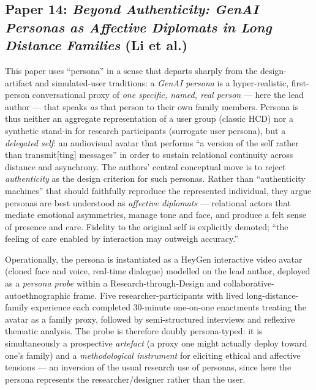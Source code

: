 
\subsection*{Paper 14: \textit{Beyond Authenticity: GenAI Personas as Affective Diplomats in Long Distance Families} (Li et al.)}

This paper uses ``persona'' in a sense that departs sharply from the design-artifact and simulated-user traditions: a \emph{GenAI persona} is a hyper-realistic, first-person conversational proxy of \emph{one specific, named, real person} --- here the lead author --- that speaks \emph{as} that person to their own family members. Persona is thus neither an aggregate representation of a user group (classic HCD) nor a synthetic stand-in for research participants (surrogate user persona), but a \emph{delegated self}: an audiovisual avatar that performs ``a version of the self rather than transmit[ting] messages'' in order to sustain relational continuity across distance and asynchrony. The authors' central conceptual move is to reject \emph{authenticity} as the design criterion for such personas. Rather than ``authenticity machines'' that should faithfully reproduce the represented individual, they argue personas are best understood as \emph{affective diplomats} --- relational actors that mediate emotional asymmetries, manage tone and face, and produce a felt sense of presence and care. Fidelity to the original self is explicitly demoted; ``the feeling of care enabled by interaction may outweigh accuracy.''

Operationally, the persona is instantiated as a HeyGen interactive video avatar (cloned face and voice, real-time dialogue) modelled on the lead author, deployed as a \emph{persona probe} within a Research-through-Design and collaborative-autoethnographic frame. Five researcher-participants with lived long-distance-family experience each completed 30-minute one-on-one enactments treating the avatar as a family proxy, followed by semi-structured interviews and reflexive thematic analysis. The probe is therefore doubly persona-typed: it is simultaneously a prospective \emph{artefact} (a proxy one might actually deploy toward one's family) and a \emph{methodological instrument} for eliciting ethical and affective tensions --- an inversion of the usual research use of personas, since here the persona represents the researcher/designer rather than the user.

